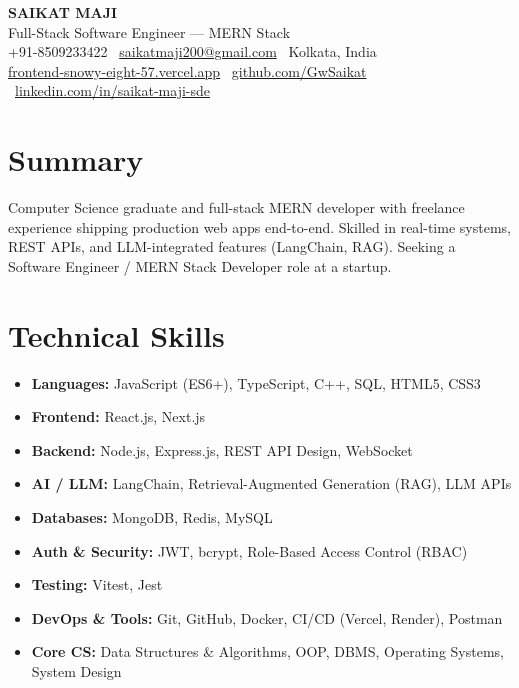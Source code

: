 \documentclass[10pt,a4paper]{article}
\begin{document}
\raggedright

\begin{center}
    {\huge\bfseries SAIKAT MAJI}\\[2pt]
    {\normalsize Full-Stack Software Engineer --- MERN Stack}\\[3pt]
    \small
    +91-8509233422 \textbar\ \href{mailto:saikatmaji200@gmail.com}{saikatmaji200@gmail.com} \textbar\ Kolkata, India\\[1pt]
    \href{https://frontend-snowy-eight-57.vercel.app}{frontend-snowy-eight-57.vercel.app} \textbar\
    \href{https://github.com/GwSaikat}{github.com/GwSaikat} \textbar\
    \href{https://www.linkedin.com/in/saikat-maji-sde}{linkedin.com/in/saikat-maji-sde}
\end{center}

\section*{Summary}
Computer Science graduate and full-stack MERN developer with freelance experience shipping production web apps end-to-end. Skilled in real-time systems, REST APIs, and LLM-integrated features (LangChain, RAG). Seeking a Software Engineer / MERN Stack Developer role at a startup.

\section*{Technical Skills}
\begin{itemize}
    \item \textbf{Languages:} JavaScript (ES6+), TypeScript, C++, SQL, HTML5, CSS3
    \item \textbf{Frontend:} React.js, Next.js
    \item \textbf{Backend:} Node.js, Express.js, REST API Design, WebSocket
    \item \textbf{AI / LLM:} LangChain, Retrieval-Augmented Generation (RAG), LLM APIs
    \item \textbf{Databases:} MongoDB, Redis, MySQL
    \item \textbf{Auth \& Security:} JWT, bcrypt, Role-Based Access Control (RBAC)
    \item \textbf{Testing:} Vitest, Jest
    \item \textbf{DevOps \& Tools:} Git, GitHub, Docker, CI/CD (Vercel, Render), Postman
    \item \textbf{Core CS:} Data Structures \& Algorithms, OOP, DBMS, Operating Systems, System Design
\end{itemize}
\end{document}
